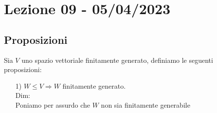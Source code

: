 \section{Lezione 09 - 05/04/2023}

\subsection{Proposizioni}
Sia $V$ uno spazio vettoriale finitamente generato, definiamo le seguenti proposizioni:
\begin{itemize}
\item[1)] $W \le V \Rightarrow W$ finitamente generato.\\
Dim:\\
Poniamo per assurdo che $W$ non sia finitamente generabile 

\end{itemize}
